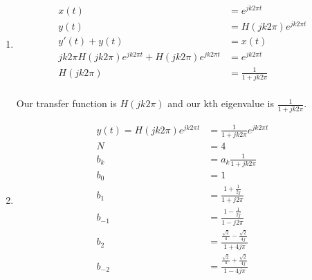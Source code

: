 \documentclass[10pt,a4paper, margin=1in]{article}
\begin{document}
\begin{enumerate}
\begin{enumerate}
\begin{center}
         \\
    \end{center} 
    \item %
    \begin{align*}
        x(t) & = e^{jk2\pi t} \\
        y(t) & = H(jk2\pi )e^{jk2\pi t} \\
        y'(t) + y(t) & = x(t) \\
        jk2\pi H(jk2\pi )e^{jk2\pi t} + H(jk2\pi )e^{jk2\pi t} & = e^{jk2\pi t} \\
        H(jk2\pi ) & = \frac{1}{1 + jk2\pi } \\
    \end{align*}

    Our transfer function is $H(jk2\pi )$ and our kth eigenvalue is $\frac{1}{1 + jk2\pi }$.\\

	\item %
    \begin{align*}
        y(t) = H(jk2\pi )e^{jk2\pi t} & = \frac{1}{1 + jk2\pi }e^{jk2\pi t} \\
        N & = 4 \\ 
        b_k & = a_k\frac{1}{1 + jk2\pi } \\ 
        b_0 & = 1 \\
        b_1 & = \frac{1 + \frac{1}{2j}}{1 + j2\pi } \\
        b_{-1} & = \frac{1 - \frac{1}{2j}}{1 - j2\pi } \\
        b_2 & = \frac{\frac{\sqrt{2}}{4} - \frac{\sqrt{2}}{4j}}{1 + 4j\pi } \\
        b_{-2} & = \frac{\frac{\sqrt{2}}{4} + \frac{\sqrt{2}}{4j}}{1 - 4j\pi } \\
    \end{align*}


\end{enumerate}
\end{enumerate}
\end{document}
